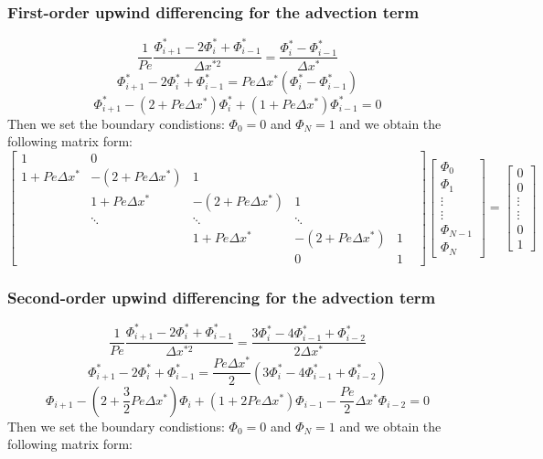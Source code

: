 \documentclass{article}
\begin{document}
\subsubsection*{First-order upwind differencing for the advection term}
\begin{equation}
    \frac{1}{Pe} \frac{\Phi^*_{i+1} - 2 \Phi^*_i + \Phi^*_{i-1}}{\Delta x^{*2}} = \frac{\Phi^*_{i} - \Phi^*_{i-1}}{\Delta x^*}
\end{equation}
\[
    \Phi^*_{i+1} - 2 \Phi^*_i + \Phi^*_{i-1} = Pe \Delta x^* (\Phi^*_{i} - \Phi^*_{i-1})
\]
\[
    \Phi^*_{i+1} - (2 + Pe \Delta x^*) \Phi^*_i + (1 + Pe \Delta x^*)\Phi^*_{i-1} = 0
\]
Then we set the boundary condistions: $\Phi_0 = 0$ and $\Phi_N = 1$ and we obtain the following matrix form:
\begin{equation}
    \begin{bmatrix}
        1 & 0 &  &  &  \\
        1 + Pe \Delta x^* & - (2 + Pe \Delta x^*) & 1 &  &  \\
        & 1 + Pe \Delta x^* & - (2 + Pe \Delta x^*) & 1 &  &  \\
            &   \ddots & \ddots & \ddots & \\
        &  &  1 + Pe \Delta x^* & - (2 + Pe \Delta x^*) & 1 \\
        &  & & 0 & 1
    \end{bmatrix}
    \begin{bmatrix}
        \Phi_0 \\
        \Phi_1 \\
        \vdots \\
        \vdots \\
        \Phi_{N-1} \\
        \Phi_N
    \end{bmatrix}
    = 
    \begin{bmatrix}
        0 \\
        0 \\
        \vdots \\
        \vdots \\
        0 \\
        1
    \end{bmatrix}
\end{equation}

\subsubsection*{Second-order upwind differencing for the advection term}
\begin{equation}
    \frac{1}{Pe} \frac{\Phi^*_{i+1} - 2 \Phi^*_i + \Phi^*_{i-1}}{\Delta x^{*2}} = \frac{3 \Phi^*_{i} - 4 \Phi^*_{i-1} + \Phi^*_{i-2}}{2 \Delta x^*}
\end{equation}
\[
    \Phi^*_{i+1} - 2 \Phi^*_i + \Phi^*_{i-1} = \frac{Pe \Delta x^*}{2} (3 \Phi^*_{i} - 4 \Phi^*_{i-1} + \Phi^*_{i-2})
\]
\[
    \Phi_{i+1} - (2 + \frac{3}{2} Pe \Delta x^*) \Phi_i + (1 + 2 Pe \Delta x^*) \Phi_{i-1} - \frac{Pe}{2} \Delta x^* \Phi_{i-2} = 0
\]    
Then we set the boundary condistions: $\Phi_0 = 0$ and $\Phi_N = 1$ and we obtain the following matrix form:
\end{document}
